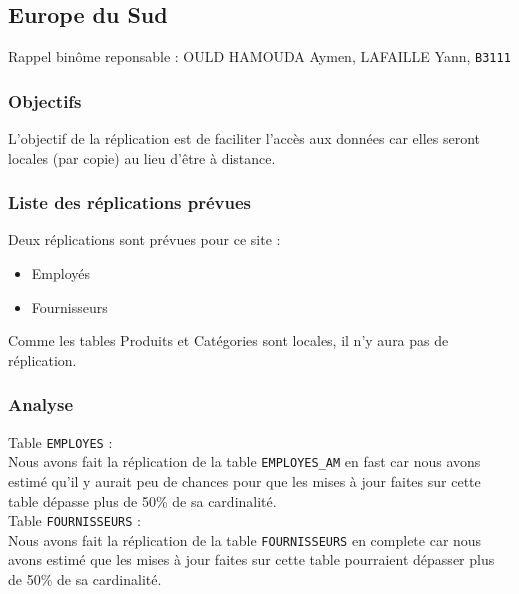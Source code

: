 \documentclass[10pt,a4paper]{article}
\theoremstyle{plain}
\begin{document}
\newpage

\subsection{Europe du Sud}
Rappel binôme reponsable : OULD HAMOUDA Aymen, LAFAILLE Yann, \verb|B3111|

\subsubsection{Objectifs}
L’objectif de la réplication est de faciliter l’accès aux données car elles seront locales (par copie) au lieu d'être à distance.

\subsubsection{Liste des réplications prévues}
Deux réplications sont prévues pour ce site :
\begin{itemize}
    \item Employés
    \item Fournisseurs
\end{itemize}
Comme les tables Produits et Catégories sont locales, il n'y aura pas de réplication.

\subsubsection{Analyse}
Table \verb|EMPLOYES| :\\
Nous avons fait la réplication de la table \verb|EMPLOYES_AM| en fast  car nous avons estimé qu’il y aurait peu de chances pour que les mises à jour faites sur cette table dépasse plus de 50\% de sa cardinalité.\\

Table \verb|FOURNISSEURS| :\\
Nous avons fait la réplication de la table \verb|FOURNISSEURS| en complete car nous avons estimé que les mises à jour faites sur cette table pourraient dépasser plus de 50\% de sa cardinalité.
\end{document}
